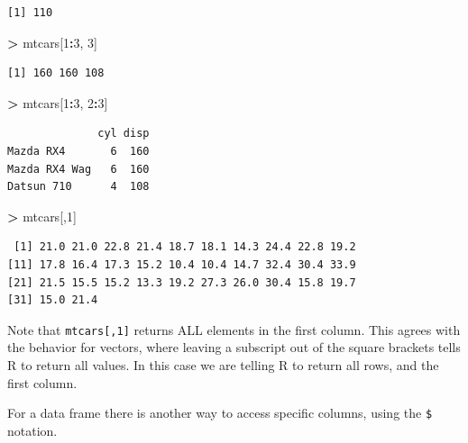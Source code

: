 \documentclass[
]{krantz}
\makeatletter
\newenvironment{Shaded}{\begin{snugshade}}{\end{snugshade}}
\newcommand{\DecValTok}[1]{\textcolor[rgb]{0.06,0.06,0.06}{#1}}
\newcommand{\NormalTok}[1]{#1}
\newcommand{\OperatorTok}[1]{\textcolor[rgb]{0.43,0.43,0.43}{\textbf{#1}}}
\newcommand{\StringTok}[1]{\textcolor[rgb]{0.5,0.5,0.5}{#1}}
\newenvironment{kframe}{%
\medskip{}
\setlength{\fboxsep}{.8em}
 \def\at@end@of@kframe{}%
 \ifinner\ifhmode%
  \def\at@end@of@kframe{\end{minipage}}%
  \begin{minipage}{\columnwidth}%
 \fi\fi%
 \def\FrameCommand##1{\hskip\@totalleftmargin \hskip-\fboxsep
 \colorbox{shadecolor}{##1}\hskip-\fboxsep
     \hskip-\linewidth \hskip-\@totalleftmargin \hskip\columnwidth}%
 \MakeFramed {\advance\hsize-\width
   \@totalleftmargin\z@ \linewidth\hsize
   \@setminipage}}%
 {\par\unskip\endMakeFramed%
 \at@end@of@kframe}
\renewenvironment{Shaded}{\begin{kframe}}{\end{kframe}}
\makeatother
\begin{document}
\begin{verbatim}
[1] 110
\end{verbatim}

\begin{Shaded}
\begin{Highlighting}[]
\OperatorTok{\textgreater{}}\StringTok{ }\NormalTok{mtcars[}\DecValTok{1}\OperatorTok{:}\DecValTok{3}\NormalTok{, }\DecValTok{3}\NormalTok{]}
\end{Highlighting}
\end{Shaded}

\begin{verbatim}
[1] 160 160 108
\end{verbatim}

\begin{Shaded}
\begin{Highlighting}[]
\OperatorTok{\textgreater{}}\StringTok{ }\NormalTok{mtcars[}\DecValTok{1}\OperatorTok{:}\DecValTok{3}\NormalTok{, }\DecValTok{2}\OperatorTok{:}\DecValTok{3}\NormalTok{]}
\end{Highlighting}
\end{Shaded}

\begin{verbatim}
              cyl disp
Mazda RX4       6  160
Mazda RX4 Wag   6  160
Datsun 710      4  108
\end{verbatim}

\begin{Shaded}
\begin{Highlighting}[]
\OperatorTok{\textgreater{}}\StringTok{ }\NormalTok{mtcars[,}\DecValTok{1}\NormalTok{]}
\end{Highlighting}
\end{Shaded}

\begin{verbatim}
 [1] 21.0 21.0 22.8 21.4 18.7 18.1 14.3 24.4 22.8 19.2
[11] 17.8 16.4 17.3 15.2 10.4 10.4 14.7 32.4 30.4 33.9
[21] 21.5 15.5 15.2 13.3 19.2 27.3 26.0 30.4 15.8 19.7
[31] 15.0 21.4
\end{verbatim}

Note that \texttt{mtcars{[},1{]}} returns ALL elements in the first column. This agrees with the behavior for vectors, where leaving a subscript out of the square brackets tells R to return all values. In this case we are telling R to return all rows, and the first column.

For a data frame there is another way to access specific columns, using the \texttt{\$} notation.

\begin{Shaded}
\end{Shaded}
\end{document}
